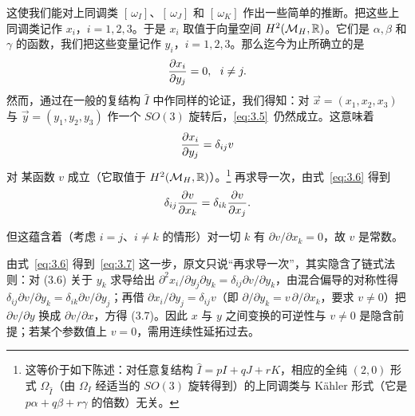 这使我们能对上同调类 $[\,\omega_I]$、$[\,\omega_J]$ 和 $[\,\omega_K]$ 作出一些简单的推断。把这些上同调类记作 $x_i$，$i=1,2,3$。于是 $x_i$ 取值于向量空间
$H^2({{\mathcal{M}}_H},{\mathbb{R}})$。它们是 $\alpha,\beta$ 和 $\gamma$ 的函数，我们把这些变量记作 $y_i$，$i=1,2,3$。那么迄今为止所确立的是
\setcounter{equation}{4}
\begin{equation}\label{eq:3.5}
  {\partial x_i\over\partial
y_j}=0,~~i\not= j.
\end{equation}
然而，通过在一般的复结构 $\hat I$ 中作同样的论证，我们得知：对 $\vec
x=(x_1,x_2,x_3)$ 与 $\vec y=(y_1,y_2,y_3)$ 作一个 $SO(3)$ 旋转后，\eqref{eq:3.5}\ 仍然成立。这意味着
\setcounter{equation}{5}
\begin{equation}\label{eq:3.6}
  {\partial x_i\over\partial y_j}=\delta_{ij}v
\end{equation}
对
某函数 $v$ 成立（它取值于 $H^2({{\mathcal{M}}_H},{\mathbb{R}})$）。\footnote{
这等价于如下陈述：对任意复结构 $\hat I=pI+qJ+rK$，相应的全纯 $(2,0)$ 形式 $\Omega_{\hat I}$（由
$\Omega_I$ 经适当的
$SO(3)$ 旋转得到）的上同调类与 Kähler 形式（它是
$p\alpha+q\beta+r\gamma$ 的倍数）无关。} 再求导一次，由式~\eqref{eq:3.6} 得到
\setcounter{equation}{6}
\begin{equation}\label{eq:3.7}
  \delta_{ij}{\partial
v\over \partial x_k}=\delta_{ik}{\partial v\over\partial x_j}.
\end{equation}

但这蕴含着（考虑 $i=j$、$i\not= k$ 的情形）对一切 $k$ 有 $\partial v/\partial x_k=0$，故
$v$ 是常数。

\begin{yizhu}[含糊点拨]
由式~\eqref{eq:3.6} 得到~\eqref{eq:3.7} 这一步，原文只说“再求导一次”，其实隐含了链式法则：对 (3.6) 关于 $y_k$ 求导给出 $\partial^2x_i/\partial y_j\partial y_k=\delta_{ij}\partial v/\partial y_k$，由混合偏导的对称性得 $\delta_{ij}\partial v/\partial y_k=\delta_{ik}\partial v/\partial y_j$；再借 $\partial x_i/\partial y_j=\delta_{ij}v$（即 $\partial/\partial y_k=v\,\partial/\partial x_k$，要求 $v\not=0$）把 $\partial v/\partial y$ 换成 $\partial v/\partial x$，方得 (3.7)。因此 $x$ 与 $y$ 之间变换的可逆性与 $v\not=0$ 是隐含前提；若某个参数值上 $v=0$，需用连续性延拓过去。
\end{yizhu}

